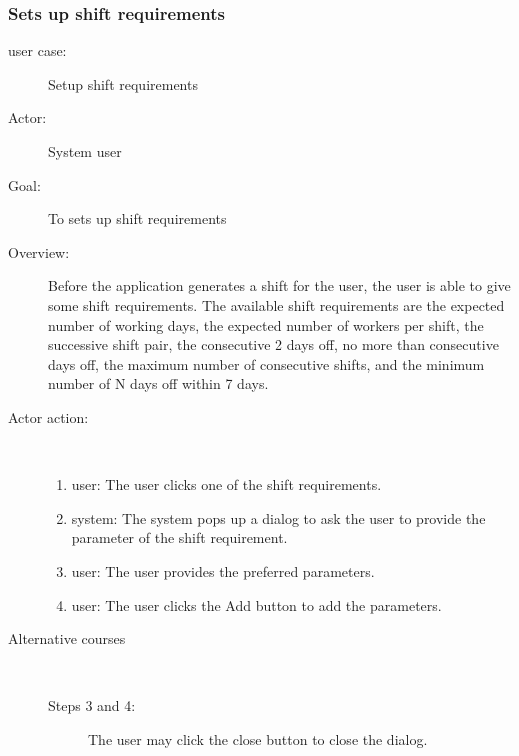 \documentclass[11pt, oneside]{article}   	%
\begin{document}
\subsubsection{Sets up shift requirements}
\begin{description}
\item[user case:] Setup shift requirements
\item[Actor:] System user
\item[Goal:]To sets up shift requirements
\item[Overview:] Before the application generates a shift for the user, the user is able to give some shift requirements.
The available shift requirements are the expected number of working days, the expected number of workers per shift, the successive shift pair, the consecutive 2 days off,  no more than consecutive days off, the maximum number of consecutive shifts, and the minimum number of N days off within 7 days.
\item[Actor action:]
\
\begin{enumerate}
\item user: The user clicks one of the shift requirements.
\item system: The system pops up a dialog to ask the user to provide the parameter of the shift requirement.
\item user: The user provides the preferred parameters.
\item user: The user clicks the Add button to add the parameters.
\end{enumerate}

\item[Alternative courses]
\
\begin{description}
\item[Steps 3 and 4:] The user may click the close button to close the dialog.
\end{description}

\end{description}
\end{document}
